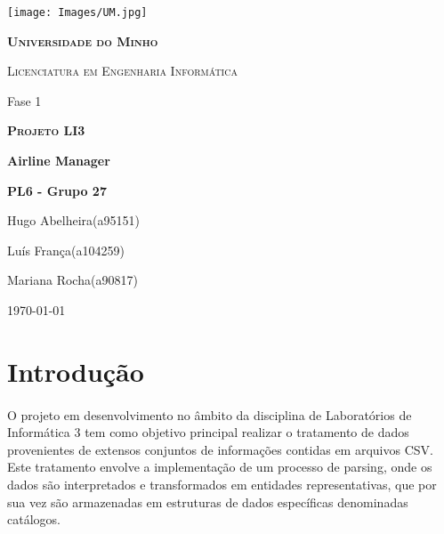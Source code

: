 \documentclass{article}
\begin{document}
\begin{center}
    \begin{minipage}{0.83\linewidth}
        \centering
        \texttt{[image: Images/UM.jpg]}\par\vspace{0.5cm}
        {\scshape\textbf{Universidade do Minho}} \par
        {\scshape Licenciatura em Engenharia Informática} \par
        \vspace{3cm}
        {\LARGE Fase 1\\} \par
        {\scshape\LARGE \textbf{Projeto LI3}\\} \par
        \vspace{1.0cm}
        {\LARGE \textbf{Airline Manager}} \par
        \vspace{2cm}
        {\LARGE\textbf {PL6 - Grupo 27}} \par
        \vspace{0.1cm}
        {\LARGE Hugo Abelheira(a95151)\par Luís França(a104259)\par Mariana Rocha(a90817) \par}
        
        \vspace{5cm}
        {\large \today\par}
        
    \end{minipage}
\end{center}
\newpage
\tableofcontents
\listoffigures

\newpage
\section{Introdução}
\paragraph{}O projeto em desenvolvimento no âmbito da disciplina de Laboratórios de Informática 3 tem como objetivo principal realizar o tratamento de dados provenientes de extensos conjuntos de informações contidas em arquivos CSV. Este tratamento envolve a implementação de um processo de parsing, onde os dados são interpretados e transformados em entidades representativas, que por sua vez são armazenadas em estruturas de dados específicas denominadas catálogos.
\vspace{-0.75cm} %
\end{document}
